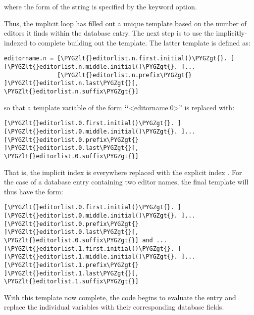 \documentclass[letterpaper,10pt,english]{sphinxmanual}
\def\PYGZlt{\char`\<}
\def\PYGZgt{\char`\>}
\begin{document}
where the form of the string  is specified by the  keyword option.

Thus, the implicit loop has filled out a unique template based on the number of editors it finds within the database entry. The next step is to use the implicitly-indexed  to complete building out the template. The latter template is defined as:

\begin{Verbatim}[commandchars=\\\{\}]
editorname.n = [\PYGZlt{}editorlist.n.first.initial()\PYGZgt{}. ][\PYGZlt{}editorlist.n.middle.initial()\PYGZgt{}. ]...
               [\PYGZlt{}editorlist.n.prefix\PYGZgt{} ]\PYGZlt{}editorlist.n.last\PYGZgt{}[, \PYGZlt{}editorlist.n.suffix\PYGZgt{}]
\end{Verbatim}

so that a template variable of the form {\color{red}\bfseries{}{}`{}`}\textless{}editorname.0\textgreater{}'' is replaced with:

\begin{Verbatim}[commandchars=\\\{\}]
[\PYGZlt{}editorlist.0.first.initial()\PYGZgt{}. ][\PYGZlt{}editorlist.0.middle.initial()\PYGZgt{}. ]...
[\PYGZlt{}editorlist.0.prefix\PYGZgt{} ]\PYGZlt{}editorlist.0.last\PYGZgt{}[, \PYGZlt{}editorlist.0.suffix\PYGZgt{}]
\end{Verbatim}

That is, the implicit index  is everywhere replaced with the explicit index . For the case of a database entry containing two editor names, the final template will thus have the form:

\begin{Verbatim}[commandchars=\\\{\}]
[\PYGZlt{}editorlist.0.first.initial()\PYGZgt{}. ][\PYGZlt{}editorlist.0.middle.initial()\PYGZgt{}. ]...
[\PYGZlt{}editorlist.0.prefix\PYGZgt{} ]\PYGZlt{}editorlist.0.last\PYGZgt{}[, \PYGZlt{}editorlist.0.suffix\PYGZgt{}] and ...
[\PYGZlt{}editorlist.1.first.initial()\PYGZgt{}. ][\PYGZlt{}editorlist.1.middle.initial()\PYGZgt{}. ]...
[\PYGZlt{}editorlist.1.prefix\PYGZgt{} ]\PYGZlt{}editorlist.1.last\PYGZgt{}[, \PYGZlt{}editorlist.1.suffix\PYGZgt{}]
\end{Verbatim}

With this template now complete, the code begins to evaluate the entry and replace the individual variables with their corresponding database fields.
\end{document}
